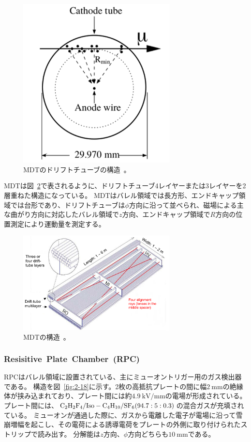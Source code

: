\begin{figure}[h]
  \centering
  \includegraphics[clip, width=8cm]{fig/2/mdt_driftTube.png}
  \caption{MDTのドリフトチューブの構造~\cite{Aad:1129811}。}
  \label{fig:2-16}
\end{figure}

MDTは図~\ref{fig:2-17}で表されるように、ドリフトチューブ4レイヤーまたは3レイヤーを2層重ねた構造になっている。
MDTはバレル領域では長方形、エンドキャップ領域では台形であり、ドリフトチューブは$\phi$方向に沿って並べられ、磁場による主な曲がり方向に対応したバレル領域で$z$方向、エンドキャップ領域で$R$方向の位置測定により運動量を測定する。

\begin{figure}[h]
  \centering
  \includegraphics[clip, width=8cm]{fig/2/MDT_chamber_schematics_2.pdf}
  \caption{MDTの構造~\cite{Aad:1129811}。}
  \label{fig:2-17}
\end{figure}

\subsubsection{Resisitive~Plate~Chamber~(RPC)}
RPCはバレル領域に設置されている、主にミューオントリガー用のガス検出器である。
構造を図~\ref{fig:2-18}に示す。2枚の高抵抗プレートの間に幅$\SI{2}{\mm}$の絶縁体が挟み込まれており、プレート間には約$\SI{4.9}{\kV/\mm}$の電場が形成されている。
プレート間には、$\rm{C_{2}H_{2}F_{4}/Iso - C_{4}H_{10}/SF_{6}(94.7 : 5 : 0.3)}$の混合ガスが充填されている。
ミューオンが通過した際に、ガスから電離した電子が電場に沿って雪崩増幅を起こし、その電荷による誘導電荷をプレートの外側に取り付けられたストリップで読み出す。
分解能は$z$方向、$\phi$方向どちらも$\SI{10}{\mm}$である。


